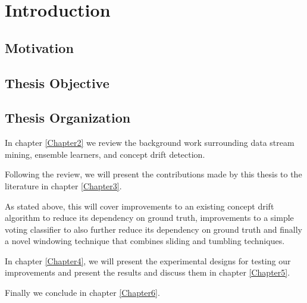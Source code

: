 
\chapter{Introduction} %

\label{Chapter1} %


\newcommand{\keyword}[1]{\textbf{#1}}
\newcommand{\tabhead}[1]{\textbf{#1}}
\newcommand{\code}[1]{\texttt{#1}}
\newcommand{\file}[1]{\texttt{\bfseries#1}}
\newcommand{\option}[1]{\texttt{\itshape#1}}


\section{Motivation}


\section{Thesis Objective}



\section{Thesis Organization}

In chapter \ref{Chapter2} we review the background work surrounding data stream mining, ensemble learners, and concept drift detection.

Following the review, we will present the contributions made by this thesis to the literature in chapter \ref{Chapter3}.

As stated above, this will cover improvements to an existing concept drift algorithm to reduce its dependency on ground truth, improvements to a simple voting classifier to also further reduce its dependency on ground truth and finally a novel windowing technique that combines sliding and tumbling techniques.

In chapter \ref{Chapter4}, we will present the experimental designs for testing our improvements and present the results and discuss them in chapter \ref{Chapter5}.

Finally we conclude in chapter \ref{Chapter6}.